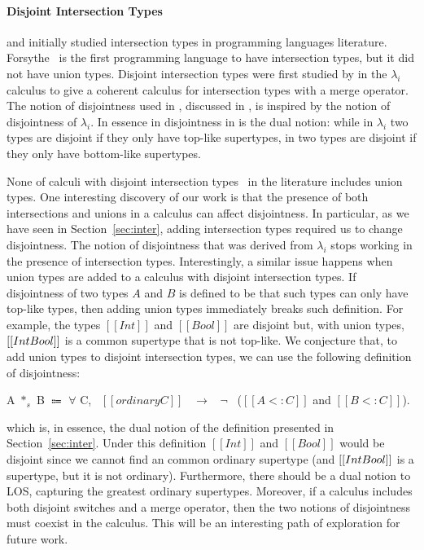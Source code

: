 \paragraph{Disjoint Intersection Types}
\citet{pottinger1980type} and \citet{coppo1981functional} initially
studied intersection types in programming languages
literature. Forsythe~\cite{reynolds1988preliminary} is the first 
programming language to have intersection types, but it did not
have union types.  Disjoint intersection types were first
studied by \citet{oliveira2016disjoint} in the $\lambda_{i}$ calculus
to give a coherent calculus for intersection types with a merge
operator. The notion of disjointness used in \cal, discussed in ,
is inspired by the notion of disjointness of $\lambda_{i}$. In essence in
disjointness in \cal is the dual notion: while in $\lambda_{i}$ two types
are disjoint if they only have top-like supertypes, in \cal two types
are disjoint if they only have bottom-like supertypes.

None of calculi with disjoint intersection types~\cite{} in the literature
includes union types. One interesting discovery of our work is that the
presence of both intersections and unions in a calculus can affect disjointness.
In particular, as we have seen in Section~\ref{sec:inter}, adding intersection types
required us to change disjointness. The notion of disjointness that was
derived from $\lambda_{i}$ stops working in the presence of intersection types.
Interestingly, a similar issue happens when union types are added to
a calculus with disjoint intersection types. If disjointness of two types $A$
and $B$ is defined to be that such types can only have top-like types,
then adding union types immediately breaks such definition.
For example, the types $[[Int]]$ and $[[Bool]]$ are disjoint but, with union
types, $[[Int \/ Bool]]$ is a common supertype that is not top-like.
We conjecture that, to add union types to disjoint intersection types,
we can use the following definition of disjointness:

\begin{definition}
\label{def:related:disj}
  A $*_s$ B $\Coloneqq$ $\forall$ C, \ $[[ordinary C]]$ \ $\rightarrow$ \ $\neg$ \ ($[[A <: C]]$ and $[[B <: C]]$).
\end{definition}

\noindent which is, in essence, the dual notion of the definition presented in
Section~\ref{sec:inter}. Under this definition $[[Int]]$ and $[[Bool]]$ would
be disjoint since we cannot find an common ordinary supertype (and $[[Int \/ Bool]]$
is a supertype, but it is not ordinary). Furthermore, there should be a
dual notion to LOS, capturing the greatest ordinary supertypes. Moreover,
if a calculus includes both disjoint switches and a merge operator,
then the two notions of disjointness must coexist in the calculus. 
This will be an interesting path of exploration for future work.

